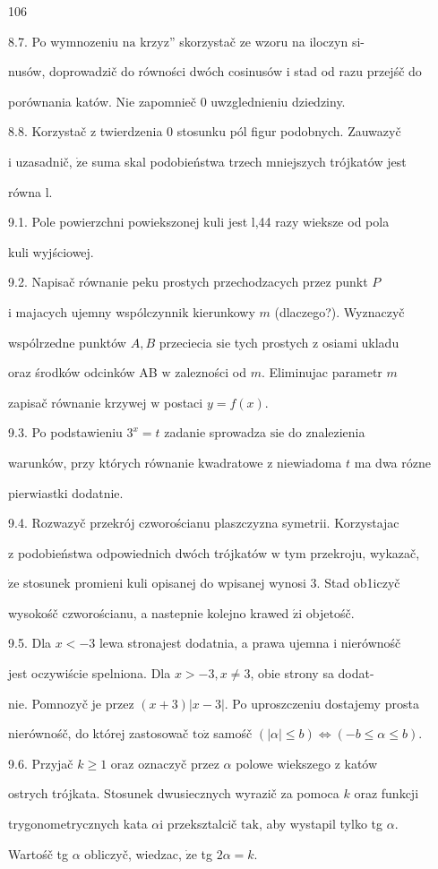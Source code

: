 \documentclass[a4paper,12pt]{article}
\begin{document}
106

8.7. Po wymnozeniu $\mathrm{n}\mathrm{a}$ krzyz'' skorzystač ze wzoru na iloczyn si-

nusów, doprowadzič do równości dwóch cosinusów $\mathrm{i}$ stad od razu przejśč do

porównania katów. Nie zapomnieč $0$ uwzglednieniu dziedziny.

8.8. Korzystač $\mathrm{z}$ twierdzenia $0$ stosunku pól figur podobnych. Zauwazyč

$\mathrm{i}$ uzasadnič, $\dot{\mathrm{z}}\mathrm{e}$ suma skal podobieństwa trzech mniejszych trójkatów jest

równa l.

9.1. Pole powierzchni powiekszonej kuli jest l,44 razy wieksze od pola

kuli wyjściowej.

9.2. Napisač równanie peku prostych przechodzacych przez punkt $P$

$\mathrm{i}$ majacych ujemny wspólczynnik kierunkowy $m$ (dlaczego?). Wyznaczyč

wspólrzedne punktów $A, B$ przeciecia $\mathrm{s}\mathrm{i}\mathrm{e}$ tych prostych $\mathrm{z}$ osiami ukladu

oraz środków odcinków AB $\mathrm{w}$ zalezności od $m$. Eliminujac parametr $m$

zapisač równanie krzywej $\mathrm{w}$ postaci $y=f(x).$

9.3. Po podstawieniu $3^{x} = t$ zadanie sprowadza $\mathrm{s}\mathrm{i}\mathrm{e}$ do znalezienia

warunków, przy których równanie kwadratowe $\mathrm{z}$ niewiadoma $t$ ma dwa rózne

pierwiastki dodatnie.

9.4. Rozwazyč przekrój czworościanu plaszczyzna symetrii. Korzystajac

$\mathrm{z}$ podobieństwa odpowiednich dwóch trójkatów $\mathrm{w}$ tym przekroju, wykazač,

$\dot{\mathrm{z}}\mathrm{e}$ stosunek promieni kuli opisanej do wpisanej wynosi 3. Stad ob1iczyč

wysokośč czworościanu, a nastepnie kolejno krawed $\acute{\mathrm{z}} \mathrm{i}$ objetośč.

9.5. Dla $x<-3$ lewa stronajest dodatnia, a prawa ujemna $\mathrm{i}$ nierównośč

jest oczywiście spelniona. Dla $x > -3, x \neq 3$, obie strony sa dodat-

nie. Pomnozyč je przez $(x+3)|x-3|$. Po uproszczeniu dostajemy prosta

nierównośč, do której zastosowač $\mathrm{t}\mathrm{o}\dot{\mathrm{z}}$ samośč $(|\alpha|\leq b)\Leftrightarrow(-b\leq\alpha\leq b).$

9.6. Przyjač $k \geq 1$ oraz oznaczyč przez $\alpha$ polowe wiekszego $\mathrm{z}$ katów

ostrych trójkata. Stosunek dwusiecznych wyrazič za pomoca $k$ oraz funkcji

trygonometrycznych kata $\alpha \mathrm{i}$ przeksztalcič $\mathrm{t}\mathrm{a}\mathrm{k}$, aby wystapil tylko tg $\alpha.$

Wartośč tg $\alpha$ obliczyč, wiedzac, $\dot{\mathrm{z}}\mathrm{e}$ tg $2\alpha=k.$
\end{document}
